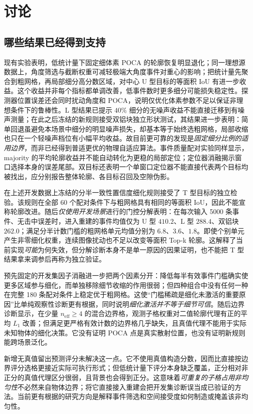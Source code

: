 \documentclass[UTF8,fontset=none,zihao=-4,a4paper]{ctexart}
\begin{document}
\section{讨论}
\subsection{哪些结果已经得到支持}
现有实验表明，低统计量下固定细体素 POCA 的轮廓恢复明显退化；同一理想源数据上，角度筛选与截断权重可减轻极端大角度事件对重心的影响；把统计量先聚合到粗网格，再局部细分高分数区域，对中心 U 型目标的等面积 IoU 有进一步收益。这个收益并非每个指标都单调改善，低事件数时更多细分可能损失稳定性。探测器位置误差还会同时扰动角度和 POCA，说明仅优化体素参数不足以保证非理想条件下的鲁棒性。L 型结果已提示 $40\%$ 细分的无噪声收益不能直接迁移到有噪声测量；在此之后冻结的新规则接受双铝块独立形状测试，其结果进一步表明：简单回退虽避免本场景中细分的明显噪声损失，却基本等于始终选粗网格，局部收缩也只在一个轻噪声档位有小幅平均收益。故目前更可靠的发现是\emph{固定细分比例的适用边界}，而非已经得到普适更优的物理自适应算法。事件质量配对实验同样显示，majority 的平均轮廓收益并不能自动转化为更稳的局部定位；定位器消融揭示窗口选择本身的误差尾部。双目标还表明一个单窗口定位器不能直接代表两个目标均被找出，应分别报告整体轮廓、各目标召回及空隙伪影。

在上述开发数据上冻结的分半一致性置信度细化规则接受了 T 型目标的独立检验。该规则在全部 60 个配对条件下与粗网格具有相同的等面积 IoU，因此不能宣称轮廓改进。随后\emph{仅使用开发场景}进行的门控分解表明：在每次输入 \num{5000} 条事件、无击中误差时，进入重建的事件均值仅为 U 型 $410.2$、L 型 $288.4$、双铝块 $262.0$；满足分半计数门槛的粗网格单元均值分别为 $6.8$、$3.6$、$1.8$。即使个别单元产生非零细化权重，连续图像扰动也不足以改变等面积 Top-k 轮廓。这解释了当前实现\emph{可能}为何失效，但分解诊断本身不是单一原因的因果证明，也不能把 T 型结果拿来调参后再称为独立验证。

预先固定的开发集因子消融进一步把两个因素分开：降低每半有效事件门槛确实使更多区域参与细化，而单独移除细节收缩的作用很弱；但四种组合中没有任何一种在完整 180 条配对条件上稳定优于粗网格。这使“门槛稀疏是细化未激活的重要原因”比单纯观察性诊断更有根据，同时说明\emph{细化激活并不等于细节可信}。随后边界诊断显示，在少量 $n_{\mathrm{eff}}\geq4$ 的混合边界格，观测子格权重对二值轮廓代理有正的平均 $L_1$ 改善；但满足更严格有效计数的边界格几乎缺失，且真值代理不能用于实际未知物体的细化决策。它没有证明 POCA 点是真实散射位置，也没有证明新规则能跨场景泛化。

新增无真值留出预测评分未解决这一点。它不使用真值构造分数，因而比直接按边界评分选格更接近实际可执行形式；但低统计量下评分本身缺乏覆盖，正分相对非正分的真值代理区分很弱，且背景也会得到正分。这意味着\emph{可重复的子格占用非均匀性}不必然来自物体边界；将它直接接入重建会把开发集诊断误当成已验证的方法。当前更有根据的研究方向是解释事件筛选和空间接受度如何制造或掩盖该非均匀性。
\end{document}
